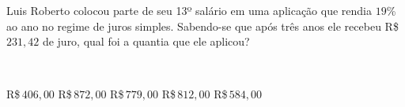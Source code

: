 \parbox{\linewidth}{

Luis Roberto colocou parte de seu 13º salário em uma aplicação que rendia $19$\% ao ano no regime de juros simples. Sabendo-se que após três anos ele recebeu R\$\,$231{,}42$ de juro, qual foi a quantia que ele aplicou?}\vspace{2mm}\\\parbox{\linewidth}{

R\$\,$406{,}00$
R\$\,$872{,}00$
R\$\,$779{,}00$
R\$\,$812{,}00$
R\$\,$584{,}00$

}

